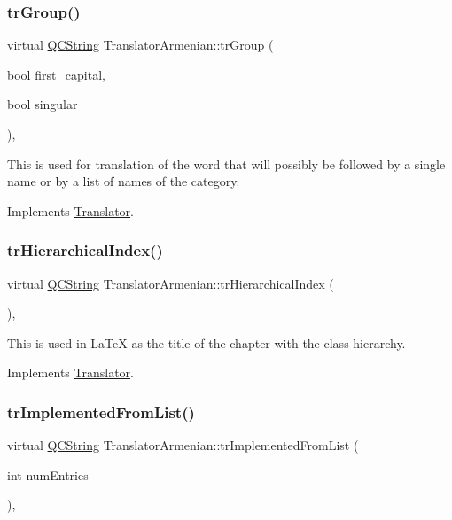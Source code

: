 \subsubsection{\texorpdfstring{trGroup()}{trGroup()}}
{\footnotesize\ttfamily virtual \mbox{\hyperlink{class_q_c_string}{Q\+C\+String}} Translator\+Armenian\+::tr\+Group (\begin{DoxyParamCaption}\item[{bool}]{first\+\_\+capital,  }\item[{bool}]{singular }\end{DoxyParamCaption})\hspace{0.3cm}{\ttfamily [inline]}, {\ttfamily [virtual]}}

This is used for translation of the word that will possibly be followed by a single name or by a list of names of the category. 

Implements \mbox{\hyperlink{class_translator}{Translator}}.

\mbox{\label{class_translator_armenian_a21f638307495536e1dc0a38efd19110e}} 
\subsubsection{\texorpdfstring{trHierarchicalIndex()}{trHierarchicalIndex()}}
{\footnotesize\ttfamily virtual \mbox{\hyperlink{class_q_c_string}{Q\+C\+String}} Translator\+Armenian\+::tr\+Hierarchical\+Index (\begin{DoxyParamCaption}{ }\end{DoxyParamCaption})\hspace{0.3cm}{\ttfamily [inline]}, {\ttfamily [virtual]}}

This is used in La\+TeX as the title of the chapter with the class hierarchy. 

Implements \mbox{\hyperlink{class_translator}{Translator}}.

\mbox{\label{class_translator_armenian_ad84c3cfa24739f34be8417ece72f8e8b}} 
\subsubsection{\texorpdfstring{trImplementedFromList()}{trImplementedFromList()}}
{\footnotesize\ttfamily virtual \mbox{\hyperlink{class_q_c_string}{Q\+C\+String}} Translator\+Armenian\+::tr\+Implemented\+From\+List (\begin{DoxyParamCaption}\item[{int}]{num\+Entries }\end{DoxyParamCaption})\hspace{0.3cm}{\ttfamily [inline]}, {\ttfamily [virtual]}}

